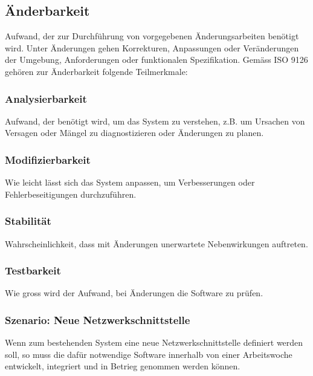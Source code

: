 \documentclass[
	ngerman,
	toc=listof, %
	toc=bibliography, %
	footnotes=multiple, %
	parskip=half, %
	numbers=noendperiod %
]{scrartcl}
\begin{document}
	\subsection{Änderbarkeit}
		Aufwand, der zur Durchführung von vorgegebenen Änderungsarbeiten benötigt wird.
		Unter Änderungen gehen Korrekturen, Anpassungen oder Veränderungen der Umgebung, Anforderungen oder funktionalen Spezifikation.
		Gemäss ISO 9126 gehören zur Änderbarkeit folgende Teilmerkmale:
		
		\subsubsection{Analysierbarkeit}
			Aufwand, der benötigt wird, um das System zu verstehen, z.B. um Ursachen von Versagen oder Mängel zu diagnostizieren oder Änderungen zu planen.

		\subsubsection{Modifizierbarkeit}
			Wie leicht lässt sich das System anpassen, um Verbesserungen oder Fehlerbeseitigungen durchzuführen.

		\subsubsection{Stabilität}
			Wahrscheinlichkeit, dass mit Änderungen unerwartete Nebenwirkungen auftreten.

		\subsubsection{Testbarkeit}
			Wie gross wird der Aufwand, bei Änderungen die Software zu prüfen.

		\subsubsection{Szenario: Neue Netzwerkschnittstelle}
			Wenn zum bestehenden System eine neue Netzwerkschnittstelle definiert werden soll, so muss die dafür notwendige Software innerhalb von einer Arbeitswoche entwickelt, integriert und in Betrieg genommen werden können.
\end{document}
